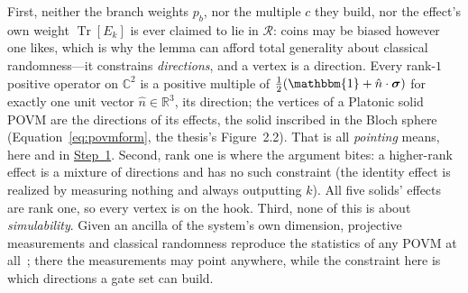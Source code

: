 \documentclass[11pt,a4paper]{article}
\DeclareMathOperator{\Tr}{Tr}
\newcommand{\C}{\mathbb{C}}
\newcommand{\R}{\mathbb{R}}
\newcommand{\Id}{\mathbbm{1}}
\newcommand{\sigmavec}{\boldsymbol{\sigma}}
\begin{document}
First, neither the branch weights $p_b$, nor the multiple $c$ they build, nor the effect's own weight $\Tr[E_k]$ is ever claimed to lie in $\mathcal{R}$: coins may be biased however one likes, which is why the lemma can afford total generality about classical randomness---it constrains \textit{directions}, and a vertex is a direction. Every rank-$1$ positive operator on $\C^2$ is a positive multiple of $\tfrac{1}{2}(\Id + \hat n \cdot \sigmavec)$ for exactly one unit vector $\hat n \in \R^3$, its direction; the vertices of a Platonic solid POVM are the directions of its effects, the solid inscribed in the Bloch sphere (Equation~\eqref{eq:povmform}, the thesis's Figure~2.2). That is all \textit{pointing} means, here and in \hyperref[sec:decker:step1]{Step~1}. Second, rank one is where the argument bites: a higher-rank effect is a mixture of directions and has no such constraint (the identity effect is realized by measuring nothing and always outputting $k$). All five solids' effects are rank one, so every vertex is on the hook. Third, none of this is about \textit{simulability}. Given an ancilla of the system's own dimension, projective measurements and classical randomness reproduce the statistics of any POVM at all~\cite[Thm.~1]{oszmaniec2017simulatingpositiveoperatorvaluedmeasures}; there the measurements may point anywhere, while the constraint here is which directions a gate set can build.
\end{document}
